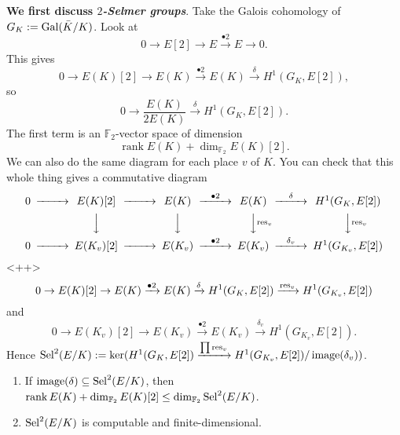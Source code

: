 \documentclass[reqno]{amsart} 
\begin{document}
\textbf{We first discuss $2$\emph{-Selmer groups}}.  Take the Galois cohomology of $G_K := \operatorname{Gal}(\bar{K} / K)$.  Look at
\begin{equation*}
  0 \rightarrow E[2] \rightarrow E \xrightarrow{\bullet 2} E \rightarrow 0.
\end{equation*}
This gives
\begin{equation*}
  0 \rightarrow E(K)[2] \rightarrow E(K) \xrightarrow{\bullet 2} E(K) \xrightarrow{\delta} H^1(G_{K}, E[2]),
\end{equation*}
so
\begin{equation*}
  0 \rightarrow
  \frac{E(K)}{2 E(K)}
  \xrightarrow{\delta} H^1(G_K, E[2]).
\end{equation*}
The first term is an $\mathbb{F}_2$-vector space of dimension
\begin{equation*}
  \operatorname{rank} E(K) + \dim_{\mathbb{F}_2} E(K)[2].
\end{equation*}
We can also do the same diagram for each place $v$ of $K$.  You can check that this whole thing gives a commutative diagram
\begin{equation*}
  \begin{CD}
    \small
    0 @>>> E(K)[2] @>>> E(K) @>{\bullet 2}>> E(K) @>{\delta}>> H^1(G_K, E[2]) \\
    @. @VVV @VVV @VV \res_vV @VV\res_vV \\
    0 @>>> E(K_v)[2] @>>> E(K_v) @>{\bullet 2}>> E(K_v) @>{\delta_v}>> H^1(G_{K_v}, E[2])
  \end{CD}
\end{equation*}<++>
\begin{equation*}
  0 \rightarrow E(K)[2] \rightarrow E(K) \xrightarrow{\bullet 2} E(K) \xrightarrow{\delta} H^1(G_K, E[2])
  \xrightarrow{\operatorname{res}_v}
  H^1(G_{K_v}, E[2])
\end{equation*}
and
\begin{equation*}
  0 \rightarrow  E(K_v)[2]
  \rightarrow E(K_v) \xrightarrow{\bullet 2}
  E(K_v)
  \xrightarrow{\delta_v} H^1(G_{K_v}, E[2]).
\end{equation*}
Hence $\operatorname{Sel}^2(E / K) := \ker(H^1(G_K, E[2]) \xrightarrow{\prod \operatorname{res}_v} H^1(G_{K_v}, E[2]) / \operatorname{image}(\delta_v))$.
\begin{enumerate}
\item If $\operatorname{image}(\delta) \subseteq \operatorname{Sel}^2(E / K)$, then $\operatorname{rank} E(K) + \dim_{\mathbb{F}_2} E(K)[2] \leq \dim_{\mathbb{F}_2} \operatorname{Sel}^2(E / K)$.
\item $\operatorname{Sel}^2(E / K)$ is computable and finite-dimensional.
\end{enumerate}
\end{document}
